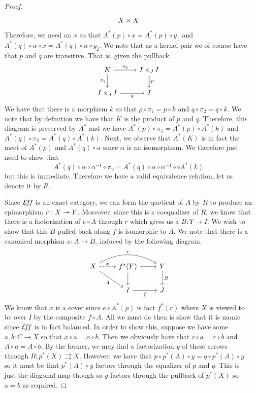 \begin{proof}
\[\begin{tikzcd}
      & X \times X &
    \end{tikzcd}
  \]
  Therefore, we need an $x$ so that
  $A^*(p) \circ x = A^*(p) \circ y_1$ and
  $A^*(q) \circ \alpha \circ x = A^*(q) \circ \alpha \circ y_2$. We
  note that as a kernel pair we of course have that $p$ and $q$ are
  transitive. That is, given the pullback
  \[
    \begin{tikzcd}
      K \ar[r, "\pi_2"] \ar[d, swap, "\pi_1"] & I \times_J I \ar[d, "p"]\\
      I \times_J I \ar[r, swap, "q"] & I
    \end{tikzcd}
  \]
  We have that there is a morphism $k$ so that
  $p \circ \pi_1 = p \circ k$ and $q \circ \pi_2 = q \circ k$. We note
  that by definition we have that $K$ is the product of $p$ and
  $q$. Therefore, this diagram is preserved by $A^*$ and we have
  $A^*(p) \circ \pi_1 = A^*(p) \circ A^*(k)$ and
  $A^*(q) \circ \pi_2 = A^*(q) \circ A^*(k)$. Next, we observe that
  $A^*(K)$ is in fact the meet of $A^*(p)$ and $A^*(q) \circ \alpha$
  since $\alpha$ is an isomorphism. We therefore just need to show
  that
  \[
    A^*(q) \circ \alpha \circ \alpha^{-1} \circ \pi_2 =
    A^*(q) \circ \alpha \circ \alpha^{-1} \circ  \circ A^*(k)
  \]
  but this is immediate. Therefore we have a valid equivalence
  relation, let us denote it by $R$.

  Since $\mathcal{E}\!f\!f$ is an exact category, we can form the quotient of $A$
  by $R$ to produce an epimorphism $r : X \twoheadrightarrow Y$. Moreover, since
  this is a coequalizer of $R$, we know that there is a factorization
  of $e \circ A$ through $r$ which gives us a $B : Y \to I$. We wish
  to show that this $B$ pulled back along $f$ is isomorphic to $A$. We
  note that there is a canonical morphism $x : A \to B$, induced by
  the following diagram.
  \[
    \begin{tikzcd}
      X \ar[dr, swap, "A"] \ar[r, dashed, "x"] \ar[rr, bend left, "r"] & f^*(Y) \ar[d] \ar[r] & Y \ar[d, "B"]\\
      & I \ar[r, swap, "f"] & J
    \end{tikzcd}
  \]
  We know that $x$ is a cover since $e \circ A^*(p)$ is fact $f^*(r)$
  where $X$ is viewed to be over $I$ by the composite $f \circ A$. All
  we must do then is show that it is monic since $\mathcal{E}\!f\!f$ is in fact
  balanced. In order to show this, suppose we have some
  $a, b : C \to X$ so that $x \circ a = x \circ b$. Then we obviously
  have that $r \circ a = r \circ b$ and $A \circ a = A \circ b$. By
  the former, we may find a factorization $y$ of these arrows through
  $R : p^*(X) \rightrightarrows X$. However, we have that
  $p \circ p^*(A) \circ y = q \circ p^*(A) \circ y$ so it must be that
  $p^*(A) \circ y$ factors through the equalizer of $p$ and $q$. This
  is just the diagonal map though so $y$ factors through the pullback
  of $p^*(X)$ so $a = b$ as required.


\end{proof}
